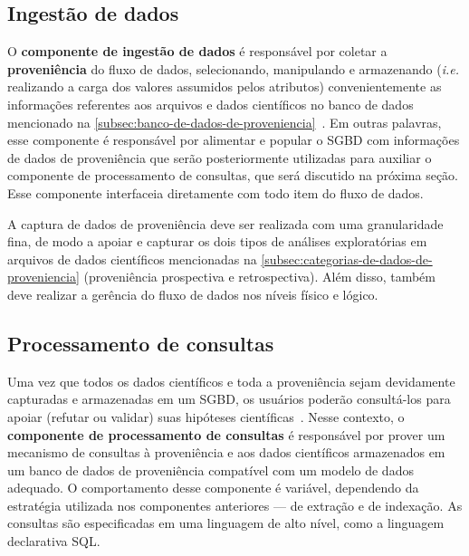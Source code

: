 \subsection{Ingestão de dados}%
\label{subsec:ingestao-de-dados}

O \textbf{componente de ingestão de dados} é responsável por coletar a \textbf{proveniência} do fluxo de dados, selecionando, manipulando e armazenando (\textit{i.e.} realizando a carga dos valores assumidos pelos atributos) convenientemente as informações referentes aos arquivos e dados científicos no banco de dados mencionado na \autoref{subsec:banco-de-dados-de-proveniencia}~\cite{silva2015propostadoutorado}. Em outras palavras, esse componente é responsável por alimentar e popular o SGBD com informações de dados de proveniência que serão posteriormente utilizadas para auxiliar o componente de processamento de consultas, que será discutido na próxima seção. Esse componente interfaceia diretamente com todo item do fluxo de dados.

A captura de dados de proveniência deve ser realizada com uma granularidade fina, de modo a apoiar e capturar os dois tipos de análises exploratórias em arquivos de dados científicos mencionadas na \autoref{subsec:categorias-de-dados-de-proveniencia} (proveniência prospectiva e retrospectiva). Além disso, também deve realizar a gerência do fluxo de dados nos níveis físico e lógico.

\subsection{Processamento de consultas}

Uma vez que todos os dados científicos e toda a proveniência sejam devidamente capturadas e armazenadas em um SGBD, os usuários poderão consultá-los para apoiar (refutar ou validar) suas hipóteses científicas~\cite{silva2015propostadoutorado}. Nesse contexto, o \textbf{componente de processamento de consultas} é responsável por prover um mecanismo de consultas à proveniência e aos dados científicos armazenados em um banco de dados de proveniência compatível com um modelo de dados adequado. O comportamento desse componente é variável, dependendo da estratégia utilizada nos componentes anteriores --- de extração e de indexação.
As consultas são especificadas em uma linguagem de alto nível, como a linguagem declarativa SQL.

